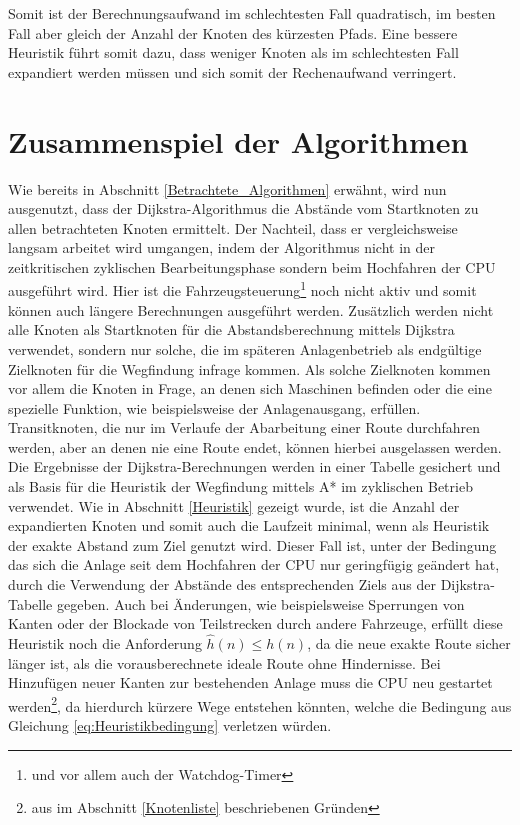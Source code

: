		Somit ist der Berechnungsaufwand im schlechtesten Fall quadratisch, im besten Fall aber gleich der Anzahl der Knoten des kürzesten Pfads. Eine bessere Heuristik führt somit dazu, dass weniger Knoten als im schlechtesten Fall expandiert werden müssen und sich somit der Rechenaufwand verringert.
		
	\section{Zusammenspiel der Algorithmen}
		\label{Verwendung_Alg}
		Wie bereits in Abschnitt \ref{Betrachtete_Algorithmen} erwähnt, wird nun ausgenutzt, dass der Dijkstra-Algorithmus die Abstände vom Startknoten zu allen betrachteten Knoten ermittelt.  Der Nachteil, dass er vergleichsweise langsam arbeitet wird umgangen, indem der Algorithmus nicht in der zeitkritischen zyklischen Bearbeitungsphase sondern beim Hochfahren der CPU ausgeführt wird. Hier ist die Fahrzeugsteuerung\footnote{und vor allem auch der Watchdog-Timer} noch nicht aktiv und somit können auch längere Berechnungen ausgeführt werden. Zusätzlich werden nicht alle Knoten als Startknoten für die Abstandsberechnung mittels Dijkstra verwendet, sondern nur solche, die im späteren Anlagenbetrieb als endgültige Zielknoten für die Wegfindung infrage kommen. Als solche Zielknoten kommen vor allem die Knoten in Frage, an denen sich Maschinen befinden oder die eine spezielle Funktion, wie beispielsweise der Anlagenausgang, erfüllen. Transitknoten, die nur im Verlaufe der Abarbeitung einer Route durchfahren werden, aber an denen nie eine Route endet, können hierbei ausgelassen werden.
		\\[4pt]
		Die Ergebnisse der Dijkstra-Berechnungen werden in einer Tabelle gesichert und als Basis für die Heuristik der Wegfindung mittels A* im zyklischen Betrieb verwendet. Wie in  Abschnitt \ref{Heuristik} gezeigt wurde, ist die Anzahl der expandierten Knoten und somit auch die Laufzeit minimal, wenn als Heuristik der exakte Abstand zum Ziel genutzt wird. Dieser Fall ist, unter der Bedingung das sich die Anlage seit dem Hochfahren der CPU nur geringfügig geändert hat, durch die Verwendung der Abstände des entsprechenden Ziels aus der Dijkstra-Tabelle gegeben. Auch bei Änderungen, wie beispielsweise Sperrungen von Kanten oder der Blockade von Teilstrecken durch andere Fahrzeuge, erfüllt diese Heuristik noch die Anforderung $\hat{h}(n)\le h(n)$, da die neue exakte Route sicher länger ist, als die vorausberechnete ideale Route ohne Hindernisse. Bei Hinzufügen neuer Kanten zur bestehenden Anlage muss die CPU neu gestartet werden\footnote{aus im Abschnitt \ref{Knotenliste} beschriebenen Gründen}, da hierdurch kürzere Wege entstehen könnten, welche die Bedingung aus Gleichung \ref{eq:Heuristikbedingung} verletzen würden.
		
		
				





